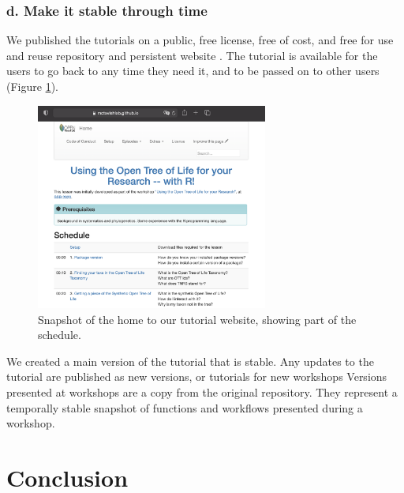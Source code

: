 \documentclass[12pt]{article}
\begin{document}
\subsubsection*{d. Make it stable through time}

We published the tutorials on a public, free license, free of cost, and free for
use and reuse repository and persistent website \citep{RopentreeTutorials, RopentreeTutorialsWebsite}.
The tutorial is available for the users to go back to any time they need it,
and to be passed on to other users (Figure \ref{fig:second}).

\begin{figure}
\begin{center}
\includegraphics[width=3in]{fig2.png}
\end{center}
\caption{Snapshot of the home to our tutorial website, showing part of the schedule. \label{fig:second}}
\end{figure}

We created a main version of the tutorial that is stable. Any updates to the tutorial are
published as new versions, or tutorials for new workshops \citep{CARPENTRIES}
 Versions presented at workshops are a copy from the original repository.
They represent a temporally stable snapshot of functions and workflows presented
during a workshop.


\section*{Conclusion}
\label{sec:conclusion}
\end{document}
